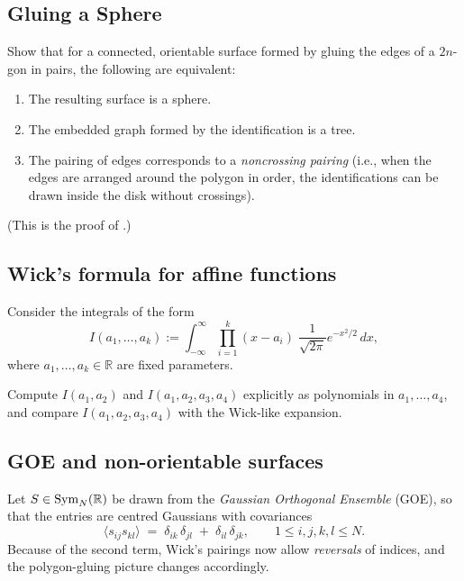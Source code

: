 \documentclass[letterpaper,11pt,oneside,reqno]{article}
\numberwithin{equation}{section}
\theoremstyle{definition}
\begin{document}
\subsection{Gluing a Sphere}
\label{prob:gluing_sphere}
Show that for a connected, orientable surface formed by gluing the edges of a $2n$-gon in pairs, the following are equivalent:
\begin{enumerate}
	\item The resulting surface is a sphere.
	\item The embedded graph formed by the identification is a tree.
	\item The pairing of edges corresponds to a \emph{noncrossing pairing} (i.e., when the edges are arranged around the polygon in order, the identifications can be drawn inside the disk without crossings).
\end{enumerate}
(This is the proof of .)

\subsection{Wick's formula for affine functions}
\label{prob:wick-linear}
Consider the integrals of the form
\[
	I(a_1, \ldots, a_k) := \int_{-\infty}^\infty \prod_{i=1}^k (x - a_i)\; \frac{1}{\sqrt{2\pi}} e^{-x^2/2}\, dx,
\]
where $a_1, \ldots, a_k \in \mathbb{R}$ are fixed parameters.

Compute $I(a_1, a_2)$ and $I(a_1, a_2, a_3, a_4)$ explicitly as polynomials in $a_1,\ldots, a_4$,
and compare $I(a_1, a_2, a_3, a_4)$ with the Wick-like expansion.

\subsection{GOE and non-orientable surfaces}
\label{prob:goe-nonorient}

Let $S\in\operatorname{Sym}_N(\Bbb R)$ be drawn from the \emph{Gaussian Orthogonal Ensemble} (GOE), so that the entries
are centred Gaussians with covariances
\[
  \langle s_{ij}s_{kl}\rangle
  \;=\;
  \delta_{ik}\,\delta_{jl}\;+\;\delta_{il}\,\delta_{jk},
  \qquad 1\le i,j,k,l\le N.
\]
Because of the second term, Wick’s pairings now allow \emph{reversals} of
indices, and the polygon-gluing picture changes accordingly.
\end{document}

